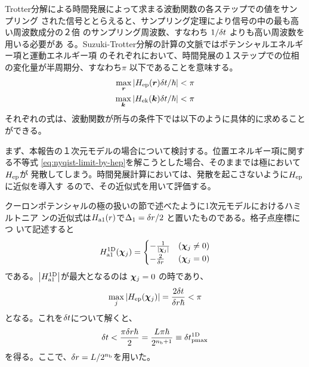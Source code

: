 \documentclass[fontsize=11pt]{jlreq}
\begin{document}
Trotter分解による時間発展によって求まる波動関数の各ステップでの値をサンプリング
された信号ととらえると、サンプリング定理により信号の中の最も高い周波数成分の２倍
のサンプリング周波数、すなわち $1/\delta t$ よりも高い周波数を用いる必要があ
る。Suzuki-Trotter分解の計算の文脈ではポテンシャルエネルギー項と運動エネルギー項
のそれぞれにおいて、時間発展の１ステップでの位相の変化量が半周期分、すなわち$\pi$
以下であることを意味する。
\begin{align}
\max_{\bm{r}}{\left| H_{\mathrm{ep}}(\bm{r})\delta t/\hbar \right|} < \pi \label{eq:nyqist-limit-by-hep}\\
\max_{\bm{k}}{\left| H_{\mathrm{ek}}(\bm{k})\delta t/\hbar \right|} < \pi \label{eq:nyqist-limit-by-hek}
\end{align}
それぞれの式は、波動関数が所与の条件下では以下のように具体的に求めることができる。

まず、本報告の１次元モデルの場合について検討する。位置エネルギー項に関する不等式
\ref{eq:nyqist-limit-by-hep}を解こうとした場合、そのままでは極において$H_{\mathrm{ep}}$が
発散してしまう。時間発展計算においては、発散を起こさないように$H_{\mathrm{ep}}$に近似を導入す
るので、その近似式を用いて評価する。

クーロンポテンシャルの極の扱いの節で述べたように1次元モデルにおけるハミルトニア
ンの近似式は$H_{\mathrm{a1}}(r)$で$\Delta_1=\delta r/2$ と置いたものである。格子点座標につ
いて記述すると
\begin{equation}
H_{\mathrm{a1}}^{\mathrm{1D}}(\bm{\chi}_{j}) = \begin{cases}
-\frac{1}{{\left| \bm{\chi}_{j} \right|}} & (\bm{\chi}_{j}\neq0) \\
-\frac{2}{\delta r} & (\bm{\chi}_{j}=0)
\end{cases}
\end{equation}
である。${\left| H_{\mathrm{a1}}^{\mathrm{1D}} \right|}$が最大となるのは $\bm{\chi}_{j}=0$ の時であり、
\begin{equation}
\max_{j}{\left| H_{\mathrm{ep}}(\bm{\chi}_{j}) \right|} = \frac{2\delta t}{\delta r\hbar}<\pi
\end{equation}
となる。これを$\delta t$について解くと、
\begin{equation}
\delta t < \frac{\pi\delta r\hbar}{2}=\frac{L\pi\hbar}{2^{n_{\mathrm{b}}+1}}\equiv\delta t_{\mathrm{pmax}}^{\mathrm{1D}}
 \label{eq:nyqist-limit-by-hep-final}
\end{equation}
を得る。ここで、$\delta r=L/2^{n_{\mathrm{b}}}$を用いた。
\end{document}

